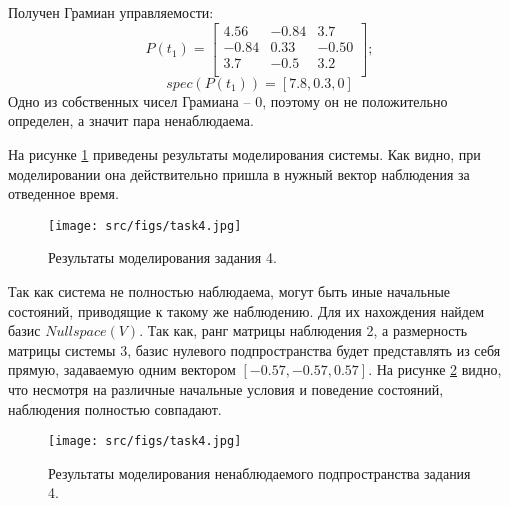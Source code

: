 Получен Грамиан управляемости:
\[
        P(t_1) = \begin{bmatrix}
        4.56 & -0.84 & 3.7 \\
        -0.84 & 0.33 & -0.50 \\
        3.7 & -0.5 & 3.2 \\
        \end{bmatrix};
\]
\[
        spec(P(t_1)) = [7.8,  0.3, 0]
\]
Одно из собственных чисел Грамиана -- 0, поэтому он не положительно определен, а значит пара ненаблюдаема.

На рисунке \ref{fig:task4} приведены результаты моделирования системы. Как видно, при моделировании она действительно пришла в нужный вектор наблюдения за отведенное время.
\begin{figure}[ht!]
        \centering
        \texttt{[image: src/figs/task4.jpg]}
        \caption{Результаты моделирования задания 4.}
        \label{fig:task4}
\end{figure}

Так как система не полностью наблюдаема, могут быть иные начальные состояний, приводящие к такому же наблюдению. Для их нахождения найдем базис \(Nullspace(V)\). Так как, ранг матрицы наблюдения 2, а размерность матрицы системы 3, базис нулевого подпространства будет представлять из себя прямую, задаваемую одним вектором \([-0.57, -0.57, 0.57]\).
На рисунке \ref{fig:task4_null} видно, что несмотря на различные начальные условия и поведение состояний, наблюдения полностью совпадают.
\begin{figure}[ht!]
        \centering
        \texttt{[image: src/figs/task4.jpg]}
        \caption{Результаты моделирования ненаблюдаемого подпространства задания 4.}
        \label{fig:task4_null}
\end{figure}

